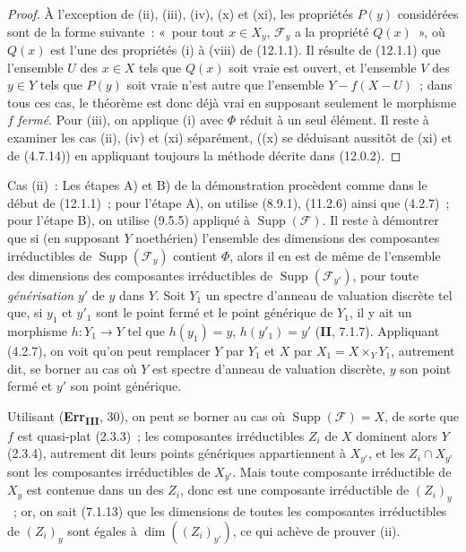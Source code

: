 \begin{proof}
À l'exception de (ii), (iii), (iv), (x) et (xi), les propriétés $P(y)$
considérées sont de la forme suivante~: «~pour tout $x\in X_y$, $\mathcal F_y$
a la propriété $Q(x)$~», où $Q(x)$ est l'une des propriétés (i) à (viii) de
(12.1.1). Il résulte de (12.1.1) que l'ensemble $U$ des $x\in X$ tels que
$Q(x)$ soit vraie est ouvert, et l'ensemble $V$ des $y\in Y$ tels que $P(y)$
soit vraie n'est autre que l'ensemble $Y-f(X-U)$~; dans tous ces cas, le
théorème est donc déjà vrai en supposant seulement le morphisme $f$ \emph{fermé}.
Pour (iii), on applique (i) avec $\Phi$ réduit à un seul élément. Il reste à
examiner les cas (ii), (iv) et (xi) séparément, ((x) se déduisant aussitôt de
(xi) et de (4.7.14)) en appliquant toujours la méthode décrite dans (12.0.2).
\end{proof}

\begin{env}[12.2.1.1]
\label{IV.12.2.1.1-fr}
Cas (ii)~: Les étapes A) et B) de la démonstration procèdent comme dans le
début de (12.1.1)~; pour l'étape A), on utilise (8.9.1), (11.2.6) ainsi que
(4.2.7)~; pour l'étape B), on utilise (9.5.5) appliqué à
$\operatorname{Supp}(\mathcal F)$. Il reste à démontrer que si (en supposant
$Y$ noethérien) l'ensemble des dimensions des composantes irréductibles de
$\operatorname{Supp}(\mathcal F_y)$ contient $\Phi$, alors il en est de même
de l'ensemble des dimensions des composantes irréductibles de
$\operatorname{Supp}(\mathcal F_{y'})$, pour toute \emph{générisation} $y'$ de
$y$ dans $Y$. Soit $Y_1$ un spectre d'anneau de valuation discrète tel que, si
$y_1$ et $y'_1$ sont le point fermé et le point générique de $Y_1$, il y ait un
morphisme $h:Y_1\to Y$ tel que $h(y_1)=y$, $h(y'_1)=y'$ (\textbf{II}, 7.1.7).
Appliquant (4.2.7), on voit qu'on peut remplacer $Y$ par $Y_1$ et $X$ par
$X_1=X\times_YY_1$, autrement dit, se borner au cas où $Y$ est spectre
d'anneau de valuation discrète, $y$ son point fermé et $y'$ son point générique.

Utilisant (\textbf{Err}\textsubscript{\textbf{III}}, 30), on peut se borner au
cas où $\operatorname{Supp}(\mathcal F)=X$, de sorte que $f$ est quasi-plat
(2.3.3)~; les composantes irréductibles $Z_i$ de $X$ dominent alors $Y$
(2.3.4), autrement dit leurs points génériques appartiennent à $X_{y'}$, et
les $Z_i\cap X_{y'}$ sont les composantes irréductibles de $X_{y'}$. Mais toute
composante irréductible de $X_y$ est contenue dans un des $Z_i$, donc est une
composante irréductible de $(Z_i)_y$~; or, on sait (7.1.13) que les dimensions
de toutes les composantes irréductibles de $(Z_i)_y$ sont égales à
$\dim((Z_i)_{y'})$, ce qui achève de prouver (ii).
\end{env}

